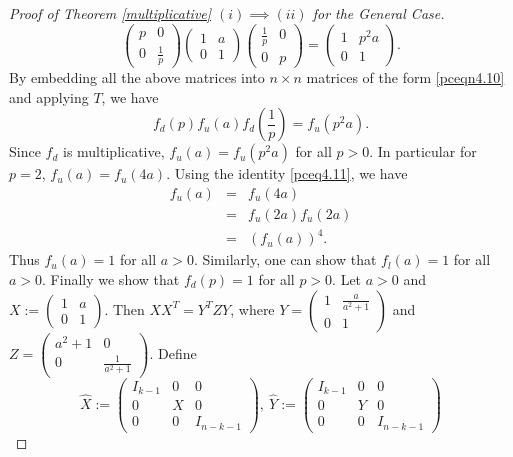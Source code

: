 \documentclass[11pt,reqno]{amsart}
\theoremstyle{plain}
\theoremstyle{definition}
\numberwithin{equation}{section}
\begin{document}
\begin{proof}[Proof of Theorem \ref{multiplicative} $(i)\implies (ii)$ for the General Case]
	\[\begin{pmatrix}
		p & 0\\ 0 & \frac{1}{p}
	\end{pmatrix} \begin{pmatrix}
	1 & a\\ 0 & 1
	\end{pmatrix} \begin{pmatrix}
	\frac{1}{p} & 0\\ 0 & p
	\end{pmatrix}=\begin{pmatrix}
	1 & p^2a\\ 0 & 1
	\end{pmatrix}.\]
By embedding all the above matrices into $n \times n$ matrices of the form \eqref{pceqn4.10} and applying $T$, we have \begin{equation}\label{pceq4.12}
f_d(p)f_u(a)f_d\left(\frac{1}{p}\right)=f_u(p^2a).
\end{equation} Since $f_d$ is multiplicative, $f_u(a)=f_u(p^2a)$ for all $p>0$. In particular for $p=2$,  $f_u(a)=f_u(4a)$.  Using the identity \eqref{pceq4.11}, we have
\begin{eqnarray*}
	f_u(a)&=&f_u(4a)\\ &=& f_u(2a)f_u(2a)\\
	 &=& (f_u(a))^4.
\end{eqnarray*}
Thus $f_u(a)=1$ for all $a>0$. Similarly, one can show that $f_l(a)=1$ for all $a>0$. Finally we show that $f_d(p)=1$ for all $p>0$. Let $a > 0$ and $X := \begin{pmatrix}
1 & a\\ 0 & 1
\end{pmatrix}$. Then 
$XX^T = Y^TZY$, where $Y  = \begin{pmatrix}
	1 & \frac{a}{a^2+1}\\ 0 & 1
\end{pmatrix}$ and $Z =\begin{pmatrix}
a^2+1 & 0\\ 0 & \frac{1}{a^2+1}
\end{pmatrix}$. Define 
\[\hat X:=\begin{pmatrix}
	I_{k-1} & 0& 0\\ 0 & X & 0\\0 & 0& I_{n-k-1}
\end{pmatrix}, ~\hat Y:=\begin{pmatrix}
I_{k-1} & 0& 0\\ 0 & Y & 0\\0 & 0& I_{n-k-1}

\end{pmatrix}\]
\end{proof}
\end{document}
